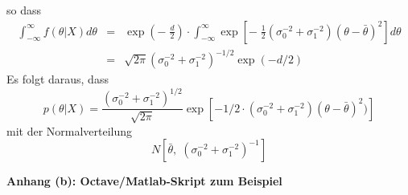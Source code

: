 so dass
\begin{equation}
\begin{array}{rcl}
\int_{-\infty}^{\infty} f(\theta|X) d \theta & = & 
\exp \left( -\; \frac{d}{2} \right) \cdot \int_{-\infty}^{\infty} 
\exp \left[ - \; \frac{1}{2} (\sigma_0^{-2}+ \sigma_1^{-2})(\theta - \bar{\theta})^2
\right] d \theta \\
&=& \sqrt{2 \pi} (\sigma_0^{-2}+\sigma_1^{-2})^{-1/2} \exp (-d/2) 
\end{array}
\end{equation}
Es folgt daraus, dass 
\begin{equation}
p(\theta|X) = \frac{(\sigma_0^{-2}+\sigma_1^{-2})^{1/2}}{\sqrt{2\pi}}
\exp \left[- 1/2 \cdot (\sigma_0^{-2}+\sigma_1^{-2})(\theta-\bar{\theta})^2)\right]
\end{equation}
mit der Normalverteilung
\begin{equation}
N\left[\bar{\theta}, \; (\sigma_0^{-2} + \sigma_1^{-2})^{-1} \right]
\end{equation}

\newpage
\textbf{Anhang (b): Octave/Matlab-Skript zum Beispiel}

